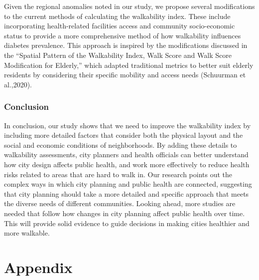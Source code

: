 \documentclass[
]{article}
\begin{document}
Given the regional anomalies noted in our study, we propose several
modifications to the current methods of calculating the walkability
index. These include incorporating health-related facilities access and
community socio-economic status to provide a more comprehensive method
of how walkability influences diabetes prevalence. This approach is
inspired by the modifications discussed in the ``Spatial Pattern of the
Walkability Index, Walk Score and Walk Score Modification for Elderly,''
which adapted traditional metrics to better suit elderly residents by
considering their specific mobility and access needs (Schuurman et
al.,2020).

\subsubsection{Conclusion}\label{conclusion}

In conclusion, our study shows that we need to improve the walkability
index by including more detailed factors that consider both the physical
layout and the social and economic conditions of neighborhoods. By
adding these details to walkability assessments, city planners and
health officials can better understand how city design affects public
health, and work more effectively to reduce health risks related to
areas that are hard to walk in. Our research points out the complex ways
in which city planning and public health are connected, suggesting that
city planning should take a more detailed and specific approach that
meets the diverse needs of different communities. Looking ahead, more
studies are needed that follow how changes in city planning affect
public health over time. This will provide solid evidence to guide
decisions in making cities healthier and more walkable.

\newpage{}

\section{Appendix}\label{appendix}
\end{document}
